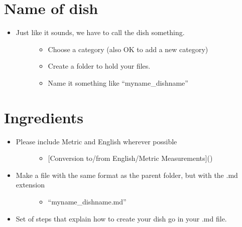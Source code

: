 \documentclass[letterpaper,10pt,english]{sphinxmanual}
\begin{document}
\section{Name of dish}
\label{\detokenize{_source/submissions:name-of-dish}}\begin{itemize}
\item {} \begin{description}
\item[{Just like it sounds, we have to call the dish something.}] \leavevmode\begin{itemize}
\item {} 
Choose a category (also OK to add a new category)

\item {} 
Create a folder to hold your files.

\item {} 
Name it something like “myname\_dishname”

\end{itemize}

\end{description}

\end{itemize}


\section{Ingredients}
\label{\detokenize{_source/submissions:ingredients}}\begin{itemize}
\item {} \begin{description}
\item[{Please include Metric and English wherever possible}] \leavevmode\begin{itemize}
\item {} 
{[}Conversion to/from English/Metric Measurements{]}()

\end{itemize}

\end{description}

\item {} \begin{description}
\item[{Make a file with the same format as the parent folder, but with the .md extension}] \leavevmode\begin{itemize}
\item {} 
“myname\_dishname.md”

\end{itemize}

\end{description}

\item {} 
Set of steps that explain how to create your dish go in your .md file.

\end{itemize}
\end{document}

